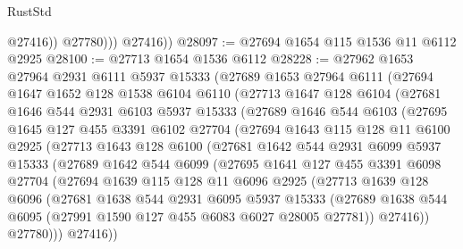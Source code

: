 \begin{lexlean}{RustStd}
\begin{coremodule}
                  @27416))
              @27780)))
        @27416))
@28097 := @27694 @1654 @115 @1536 @11 @6112 @2925
@28100 := @27713 @1654 @1536 @6112
@28228 := @27962
    @1653
    @27964
    @2931
    @6111
    @5937
    @15333
    (@27689
      @1653
      @27964
      @6111
      (@27694
        @1647
        @1652
        @128
        @1538
        @6104
        @6110
        (@27713
          @1647
          @128
          @6104
          (@27681
            @1646
            @544
            @2931
            @6103
            @5937
            @15333
            (@27689
              @1646
              @544
              @6103
              (@27695
                @1645
                @127
                @455
                @3391
                @6102
                @27704
                (@27694
                  @1643
                  @115
                  @128
                  @11
                  @6100
                  @2925
                  (@27713
                    @1643
                    @128
                    @6100
                    (@27681
                      @1642
                      @544
                      @2931
                      @6099
                      @5937
                      @15333
                      (@27689
                        @1642
                        @544
                        @6099
                        (@27695
                          @1641
                          @127
                          @455
                          @3391
                          @6098
                          @27704
                          (@27694
                            @1639
                            @115
                            @128
                            @11
                            @6096
                            @2925
                            (@27713
                              @1639
                              @128
                              @6096
                              (@27681
                                @1638
                                @544
                                @2931
                                @6095
                                @5937
                                @15333
                                (@27689
                                  @1638
                                  @544
                                  @6095
                                  (@27991 @1590 @127 @455 @6083 @6027 @28005 @27781))
                                @27416))
                            @27780)))
                      @27416))

\end{coremodule}
\end{lexlean}
